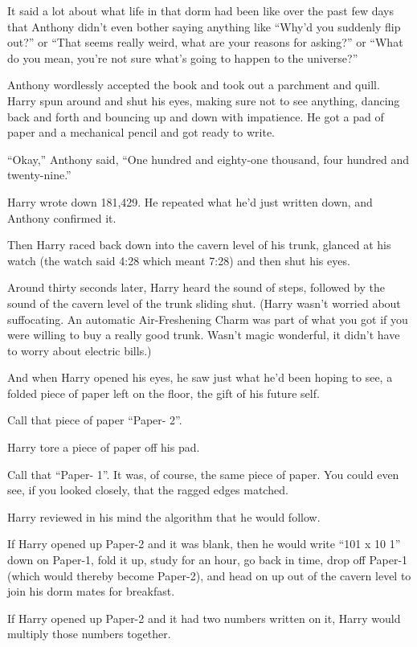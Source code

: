 It said a lot about what life in that dorm had been like over the past few days that Anthony didn't even bother saying anything like ``Why'd you suddenly flip out?'' or ``That seems really weird, what are your reasons for asking?'' or ``What do you mean, you're not sure what's going to happen to the universe?''

Anthony wordlessly accepted the book and took out a parchment and quill. Harry spun around and shut his eyes, making sure not to see anything, dancing back and forth and bouncing up and down with impatience. He got a pad of paper and a mechanical pencil and got ready to write.

``Okay,'' Anthony said, ``One hundred and eighty-one thousand, four hundred and twenty-nine.''

Harry wrote down 181,429. He repeated what he'd just written down, and Anthony confirmed it.

Then Harry raced back down into the cavern level of his trunk, glanced at his watch (the watch said 4:28 which meant 7:28) and then shut his eyes.

Around thirty seconds later, Harry heard the sound of steps, followed by the sound of the cavern level of the trunk sliding shut. (Harry wasn't worried about suffocating. An automatic Air-Freshening Charm was part of what you got if you were willing to buy a really good trunk. Wasn't magic wonderful, it didn't have to worry about electric bills.)

And when Harry opened his eyes, he saw just what he'd been hoping to see, a folded piece of paper left on the floor, the gift of his future self.

Call that piece of paper ``Paper- 2''.

Harry tore a piece of paper off his pad.

Call that ``Paper- 1''. It was, of course, the same piece of paper. You could even see, if you looked closely, that the ragged edges matched.

Harry reviewed in his mind the algorithm that he would follow.

If Harry opened up Paper-2 and it was blank, then he would write ``101 x 10 1'' down on Paper-1, fold it up, study for an hour, go back in time, drop off Paper-1 (which would thereby become Paper-2), and head on up out of the cavern level to join his dorm mates for breakfast.

If Harry opened up Paper-2 and it had two numbers written on it, Harry would multiply those numbers together.

